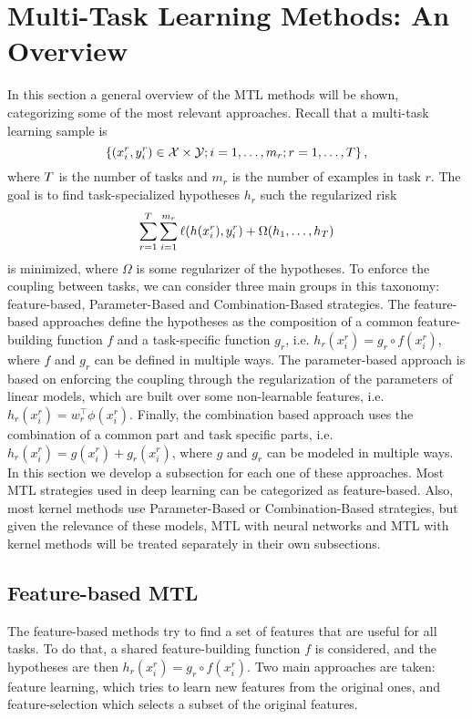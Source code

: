 \section{Multi-Task Learning Methods: An Overview}\label{sec:ch3_overview}
In this section a general overview of the MTL methods will be shown, categorizing some of the most relevant approaches. 
%
Recall that a multi-task learning sample is
$$ \left\{(x_i^r, y_i^r) \in \mathcal{X} \times \mathcal{Y}; i=1,\ldots, m_r; r=1,\ldots, T\right\},$$
where $T$ is the number of tasks and $m_r$ is the number of examples in task $r$.
The goal is to find task-specialized hypotheses $h_r$ such the regularized risk 
\begin{equation}
    \nonumber
    \sum_{r=1}^T \sum_{i=1}^{m_r} \ell(h(x_i^r), y_i^r) + \Omega(h_1, \ldots, h_T)
\end{equation}
is minimized, where $\Omega$ is some regularizer of the hypotheses. 
To enforce the coupling between tasks, we can consider three main groups in this taxonomy: feature-based, Parameter-Based and Combination-Based strategies. 
The feature-based approaches define the hypotheses as the composition of a common feature-building function $f$ and a task-specific function $g_r$, i.e. $h_r(x_i^r) = g_r \circ f(x_i^r)$, where $f$ and $g_r$ can be defined in multiple ways.
The parameter-based approach is based on enforcing the coupling through the regularization of the parameters of linear models, which are built over some non-learnable features, i.e. $h_r(x_i^r) = w_r^\intercal \phi(x_i^r)$.
Finally, the combination based approach uses the combination of a common part and task specific parts, i.e. $h_r(x_i^r) = g(x_i^r) + g_r(x_i^r)$, where $g$ and $g_r$ can be modeled in multiple ways.
In this section we develop a subsection for each one of these approaches.
%
Most MTL strategies used in deep learning can be categorized as feature-based. Also, most kernel methods use Parameter-Based or Combination-Based strategies, but given the relevance of these models, MTL with neural networks and MTL with kernel methods will be treated separately in their own subsections. 

\subsection{Feature-based MTL}\label{subsec:featbased_mtl}
The feature-based methods try to find a set of features that are useful for all tasks.
To do that, a shared feature-building function $f$ is considered, and the hypotheses are then $h_r(x_i^r) = g_r \circ f(x_i^r)$.
Two main approaches are taken: feature learning, which tries to learn new features from the original ones, and feature-selection which selects a subset of the original features.



